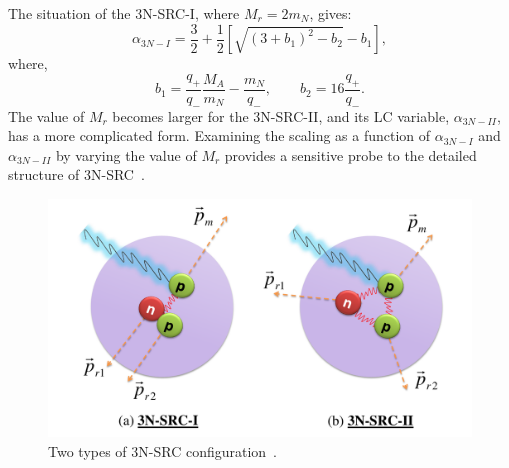 The situation of the 3N-SRC-I, where $M_{r}=2m_{N}$, gives:
\begin{equation}
  \alpha_{3N-I} = \frac{3}{2}+\frac{1}{2}[\sqrt{ (3+b_{1})^{2}-b_{2}}-b_{1}],
\end{equation} 
where,
\begin{equation}
  b_{1} = \frac{q_{+}}{q_{-}} \frac{M_{A}}{m_{N}}-\frac{m_{N}}{q_{-}},\qquad b_{2} = 16 \frac{q_{+}}{q_{-}}.
\end{equation} 
The value of $M_{r}$ becomes larger for the 3N-SRC-II, and its LC variable, $\alpha_{3N-II}$, has a more complicated form. Examining the scaling as a function of $\alpha_{3N-I}$ and $\alpha_{3N-II}$ by varying the value of $M_{r}$ provides a sensitive probe to the detailed structure of 3N-SRC~\cite{e08014_pr}.
\begin{figure}[h]
	  \begin{center}
	    \includegraphics[type=pdf,ext=.pdf,read=.pdf,width=0.80\linewidth]{./figures/physics/3nsrc_two_types}
	    \caption[Two types of 3N-SRC configuration]{\footnotesize{Two types of 3N-SRC configuration~\cite{Frankfurt_misak}.}}
	  \label{3nsrc_two_types}
	  \end{center}
\end{figure} 
